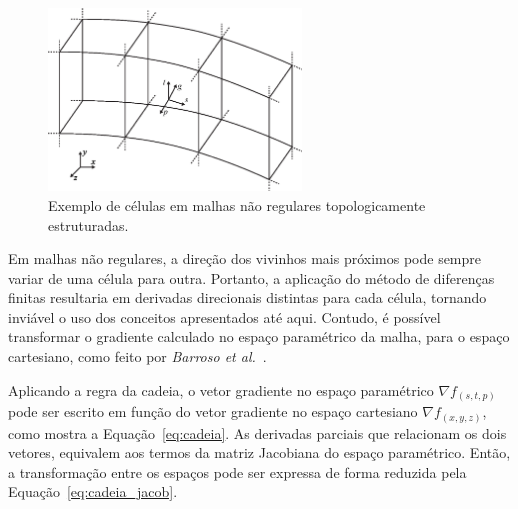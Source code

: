 \begin{figure}[h]
	\centering
	\includegraphics[width=0.6\textwidth]{images/m_irregular_cells}
	\caption{Exemplo de células em malhas não regulares topologicamente estruturadas.}
	\label{fig:m_irregular_cells}
\end{figure}

	Em malhas não regulares, a direção dos vivinhos mais próximos pode sempre variar de uma célula para outra. Portanto, a aplicação do método de diferenças finitas resultaria em derivadas direcionais distintas para cada célula, tornando inviável o uso dos conceitos apresentados até aqui. Contudo, é possível transformar o gradiente calculado no espaço paramétrico da malha, para o espaço cartesiano, como feito por \textit{Barroso et al.}~\cite{barata}.
	
	Aplicando a regra da cadeia, o vetor gradiente no espaço paramétrico $ \nabla f_{(s, t, p)} $ pode ser escrito em função do vetor gradiente no espaço cartesiano $ \nabla f_{(x, y, z)} $, como mostra a Equação~\eqref{eq:cadeia}. As derivadas parciais que relacionam os dois vetores, equivalem aos termos da matriz Jacobiana do espaço paramétrico. Então, a transformação entre os espaços pode ser expressa de forma reduzida pela Equação~\eqref{eq:cadeia_jacob}.
	\\
	
